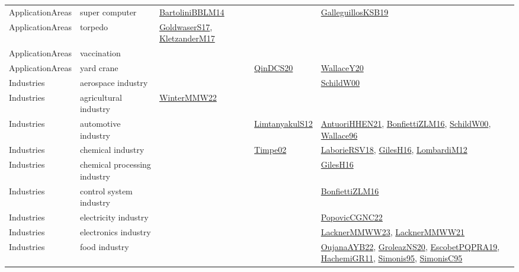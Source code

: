 {\begin{longtable}{llp{6cm}p{6cm}p{6cm}}
ApplicationAreas & super computer & \href{papers/BartoliniBBLM14.pdf}{BartoliniBBLM14}\cite{BartoliniBBLM14} &  & \href{papers/GalleguillosKSB19.pdf}{GalleguillosKSB19}\cite{GalleguillosKSB19}\\
ApplicationAreas & torpedo & \href{papers/GoldwaserS17.pdf}{GoldwaserS17}\cite{GoldwaserS17}, \href{papers/KletzanderM17.pdf}{KletzanderM17}\cite{KletzanderM17} &  & \\
ApplicationAreas & vaccination &  &  & \\
ApplicationAreas & yard crane &  & \href{articles/QinDCS20.pdf}{QinDCS20}\cite{QinDCS20} & \href{articles/WallaceY20.pdf}{WallaceY20}\cite{WallaceY20}\\
Industries & aerospace industry &  &  & \href{articles/SchildW00.pdf}{SchildW00}\cite{SchildW00}\\
Industries & agricultural industry & \href{papers/WinterMMW22.pdf}{WinterMMW22}\cite{WinterMMW22} &  & \\
Industries & automotive industry &  & \href{articles/LimtanyakulS12.pdf}{LimtanyakulS12}\cite{LimtanyakulS12} & \href{papers/AntuoriHHEN21.pdf}{AntuoriHHEN21}\cite{AntuoriHHEN21}, \href{papers/BonfiettiZLM16.pdf}{BonfiettiZLM16}\cite{BonfiettiZLM16}, \href{articles/SchildW00.pdf}{SchildW00}\cite{SchildW00}, \href{articles/Wallace96.pdf}{Wallace96}\cite{Wallace96}\\
Industries & chemical industry &  & \href{articles/Timpe02.pdf}{Timpe02}\cite{Timpe02} & \href{articles/LaborieRSV18.pdf}{LaborieRSV18}\cite{LaborieRSV18}, \href{papers/GilesH16.pdf}{GilesH16}\cite{GilesH16}, \href{articles/LombardiM12.pdf}{LombardiM12}\cite{LombardiM12}\\
Industries & chemical processing industry &  &  & \href{papers/GilesH16.pdf}{GilesH16}\cite{GilesH16}\\
Industries & control system industry &  &  & \href{papers/BonfiettiZLM16.pdf}{BonfiettiZLM16}\cite{BonfiettiZLM16}\\
Industries & electricity industry &  &  & \href{papers/PopovicCGNC22.pdf}{PopovicCGNC22}\cite{PopovicCGNC22}\\
Industries & electronics industry &  &  & \href{articles/LacknerMMWW23.pdf}{LacknerMMWW23}\cite{LacknerMMWW23}, \href{papers/LacknerMMWW21.pdf}{LacknerMMWW21}\cite{LacknerMMWW21}\\
Industries & food industry &  &  & \href{papers/OujanaAYB22.pdf}{OujanaAYB22}\cite{OujanaAYB22}, \href{papers/GroleazNS20.pdf}{GroleazNS20}\cite{GroleazNS20}, \href{articles/EscobetPQPRA19.pdf}{EscobetPQPRA19}\cite{EscobetPQPRA19}, \href{articles/HachemiGR11.pdf}{HachemiGR11}\cite{HachemiGR11}, \href{papers/Simonis95.pdf}{Simonis95}\cite{Simonis95}, \href{papers/SimonisC95.pdf}{SimonisC95}\cite{SimonisC95}\\

\end{longtable}}
